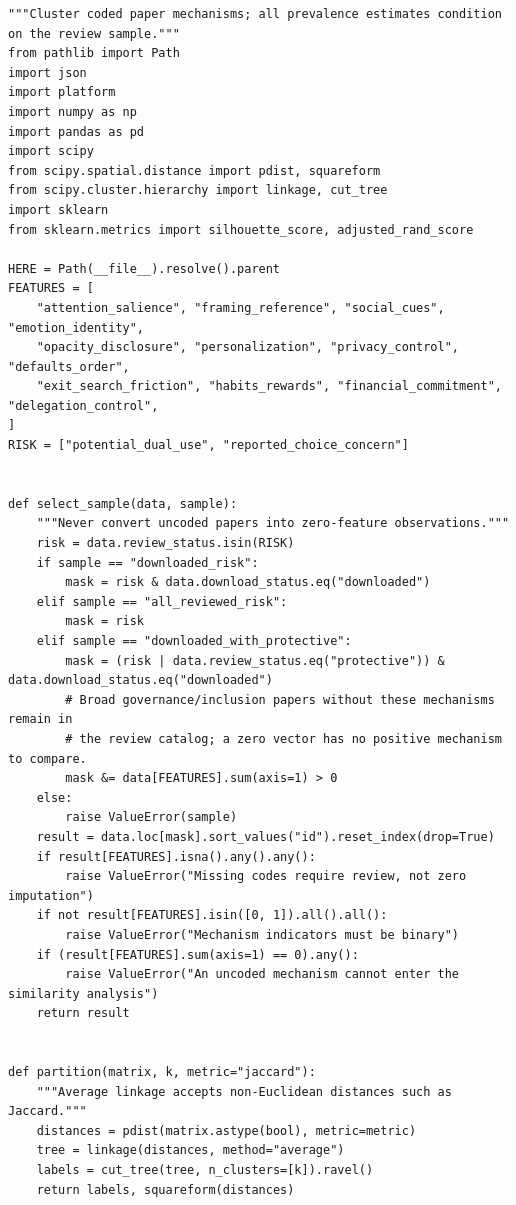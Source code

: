 \begin{Verbatim}[breaklines,breakanywhere,fontsize=\small]
"""Cluster coded paper mechanisms; all prevalence estimates condition on the review sample."""
from pathlib import Path
import json
import platform
import numpy as np
import pandas as pd
import scipy
from scipy.spatial.distance import pdist, squareform
from scipy.cluster.hierarchy import linkage, cut_tree
import sklearn
from sklearn.metrics import silhouette_score, adjusted_rand_score

HERE = Path(__file__).resolve().parent
FEATURES = [
    "attention_salience", "framing_reference", "social_cues", "emotion_identity",
    "opacity_disclosure", "personalization", "privacy_control", "defaults_order",
    "exit_search_friction", "habits_rewards", "financial_commitment", "delegation_control",
]
RISK = ["potential_dual_use", "reported_choice_concern"]


def select_sample(data, sample):
    """Never convert uncoded papers into zero-feature observations."""
    risk = data.review_status.isin(RISK)
    if sample == "downloaded_risk":
        mask = risk & data.download_status.eq("downloaded")
    elif sample == "all_reviewed_risk":
        mask = risk
    elif sample == "downloaded_with_protective":
        mask = (risk | data.review_status.eq("protective")) & data.download_status.eq("downloaded")
        # Broad governance/inclusion papers without these mechanisms remain in
        # the review catalog; a zero vector has no positive mechanism to compare.
        mask &= data[FEATURES].sum(axis=1) > 0
    else:
        raise ValueError(sample)
    result = data.loc[mask].sort_values("id").reset_index(drop=True)
    if result[FEATURES].isna().any().any():
        raise ValueError("Missing codes require review, not zero imputation")
    if not result[FEATURES].isin([0, 1]).all().all():
        raise ValueError("Mechanism indicators must be binary")
    if (result[FEATURES].sum(axis=1) == 0).any():
        raise ValueError("An uncoded mechanism cannot enter the similarity analysis")
    return result


def partition(matrix, k, metric="jaccard"):
    """Average linkage accepts non-Euclidean distances such as Jaccard."""
    distances = pdist(matrix.astype(bool), metric=metric)
    tree = linkage(distances, method="average")
    labels = cut_tree(tree, n_clusters=[k]).ravel()
    return labels, squareform(distances)



\end{Verbatim}

